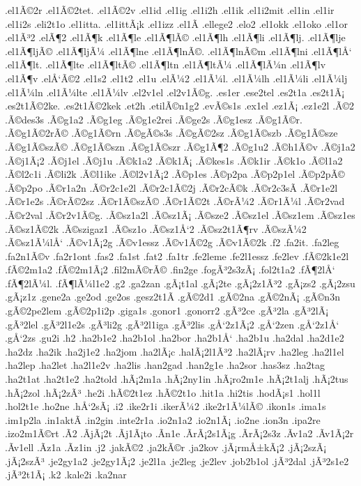 {.el1Ã©2r
.el1Ã©2tet.
.el1Ã©2v
.el1id
.el1ig
.el1i2h
.el1ik
.el1i2mit
.el1in
.el1ir
.el1i2s
.eli2t1o
.el1itta.
.el1ittÃ¡k
.el1izz
.el1Ã­
.ellege2
.elo2
.el1okk
.el1oko
.el1or
.el1Ã³2
.elÃ¶2
.el1Ã¶k
.el1Ã¶le
.el1Ã¶lÃ©
.el1Ã¶lh
.el1Ã¶li
.el1Ã¶lj.
.el1Ã¶lje
.el1Ã¶ljÃ©
.el1Ã¶ljÃ¼
.el1Ã¶lne
.el1Ã¶lnÃ©.
.el1Ã¶lnÃ©m
.el1Ã¶lni
.el1Ã¶lÅ‘
.el1Ã¶lt.
.el1Ã¶lte
.el1Ã¶ltÃ©
.el1Ã¶ltn
.el1Ã¶ltÃ¼
.el1Ã¶lÃ¼n
.el1Ã¶lv
.el1Ã¶v
.elÅ‘Ã©2
.el1s2
.el1t2
.el1u
.elÃ¼2
.el1Ã¼l.
.el1Ã¼lh
.el1Ã¼li
.el1Ã¼lj
.el1Ã¼ln
.el1Ã¼lte
.el1Ã¼lv
.el2v1el
.el2v1Ã©g.
.es1er
.ese2tel
.es2t1a
.es2t1Ã¡
.es2t1Ã©2ke.
.es2t1Ã©2kek
.et2h
.etilÃ©n1g2
.evÃ©s1s
.ex1el
.ez1Ã¡
.ez1e2l
.Ã©2
.Ã©des3s
.Ã©g1a2
.Ã©g1eg
.Ã©g1e2rei
.Ã©ge2s
.Ã©g1esz
.Ã©g1Ã©r.
.Ã©g1Ã©2rÃ©
.Ã©g1Ã©rn
.Ã©gÃ©s3s
.Ã©gÃ©2sz
.Ã©g1Ã©szb
.Ã©g1Ã©sze
.Ã©g1Ã©szÃ©
.Ã©g1Ã©szn
.Ã©g1Ã©szr
.Ã©g1Ã¶2
.Ã©g1u2
.Ã©h1Ã©v
.Ã©j1a2
.Ã©j1Ã¡2
.Ã©j1el
.Ã©j1u
.Ã©k1a2
.Ã©k1Ã¡
.Ã©kes1s
.Ã©k1ir
.Ã©k1o
.Ã©l1a2
.Ã©l2c1i
.Ã©li2k
.Ã©l1ike
.Ã©l2v1Ã¡2
.Ã©p1es
.Ã©p2pa
.Ã©p2p1el
.Ã©p2pÃ©
.Ã©p2po
.Ã©r1a2n
.Ã©r2c1e2l
.Ã©r2c1Ã©2j
.Ã©r2cÃ©k
.Ã©r2c3sÃ­
.Ã©r1e2l
.Ã©r1e2s
.Ã©rÃ©2sz
.Ã©r1Ã©szÃ©
.Ã©r1Ã©2t
.Ã©rÃ¼2
.Ã©r1Ã¼l
.Ã©r2vad
.Ã©r2val
.Ã©r2v1Ã©g.
.Ã©sz1a2l
.Ã©sz1Ã¡
.Ã©sze2
.Ã©sz1el
.Ã©sz1em
.Ã©sz1es
.Ã©sz1Ã©2k
.Ã©szigaz1
.Ã©sz1o
.Ã©sz1Å‘2
.Ã©sz2t1Ã¶rv
.Ã©szÃ¼2
.Ã©sz1Ã¼lÅ‘
.Ã©v1Ã¡2g
.Ã©v1essz
.Ã©v1Ã©2g
.Ã©v1Ã©2k
.f2
.fa2it.
.fa2leg
.fa2n1Ã©v
.fa2r1ont
.fas2
.fa1st
.fat2
.fa1tr
.fe2leme
.fe2l1essz
.fe2lev
.fÃ©2k1e2l
.fÃ©2m1a2
.fÃ©2m1Ã¡2
.fil2mÃ©rÃ©
.fin2ge
.fogÃ³2s3zÃ¡
.fol2t1a2
.fÃ¶2lÅ‘
.fÃ¶2lÃ¼l.
.fÃ¶lÃ¼l1e2
.g2
.ga2zan
.gÃ¡t1al
.gÃ¡2te
.gÃ¡2z1Ã³2
.gÃ¡zs2
.gÃ¡2zsu
.gÃ¡z1z
.gene2a
.ge2od
.ge2os
.gesz2t1Ã­
.gÃ©2d1
.gÃ©2na
.gÃ©2nÃ¡
.gÃ©n3n
.gÃ©2pe2lem
.gÃ©2p1i2p
.giga1s
.gonor1
.gonorr2
.gÃ³2ce
.gÃ³2la
.gÃ³2lÃ¡
.gÃ³2lel
.gÃ³2l1e2s
.gÃ³li2g
.gÃ³2l1iga
.gÃ³2lis
.gÅ‘2z1Ã¡2
.gÅ‘2zen
.gÅ‘2z1Å‘
.gÅ‘2zs
.gu2i
.h2
.ha2b1e2
.ha2b1ol
.ha2bor
.ha2b1Å‘
.ha2b1u
.ha2dal
.ha2d1e2
.ha2dz
.ha2ik
.ha2j1e2
.ha2jom
.ha2lÃ¡c
.halÃ¡2l1Ã³2
.ha2lÃ¡rv
.ha2leg
.ha2l1el
.ha2lep
.ha2let
.ha2l1e2v
.ha2lis
.han2gad
.han2g1e
.ha2sor
.has3sz
.ha2tag
.ha2t1at
.ha2t1e2
.ha2told
.hÃ¡2m1a
.hÃ¡2ny1in
.hÃ¡ro2m1e
.hÃ¡2t1alj
.hÃ¡2tus
.hÃ¡2zol
.hÃ¡2zÃ³
.he2i
.hÃ©2t1ez
.hÃ©2t1o
.hit1a
.hi2tis
.hodÃ¡s1
.hol1l
.hol2t1e
.ho2ne
.hÅ‘2sÃ¡
.i2
.ike2r1i
.ikerÃ¼2
.ike2r1Ã¼lÃ©
.ikon1s
.ima1s
.im1p2la
.in1aktÃ­
.in2gin
.inte2r1a
.io2n1a2
.io2n1Ã¡
.io2ne
.ion3n
.ipa2re
.izo2m1Ã©rt
.Ã­2
.Ã­jÃ¡2t
.Ã­j1Ã¡to
.Ã­n1e
.Ã­rÃ¡2s1Ã¡g
.Ã­rÃ¡2s3z
.Ã­v1a2
.Ã­v1Ã¡2r
.Ã­v1ell
.Ã­z1a
.Ã­z1in
.j2
.jakÃ©2
.ja2kÃ©r
.ja2kov
.jÃ¡rmÅ±kÃ¡2
.jÃ¡2szÃ¡
.jÃ¡2szÃ³
.je2gy1a2
.je2gy1Ã¡2
.je2l1a
.je2leg
.je2lev
.job2b1ol
.jÃ³2dal
.jÃ³2s1e2
.jÃ³2t1Ã¡
.k2
.kale2i
.ka2nar
}
